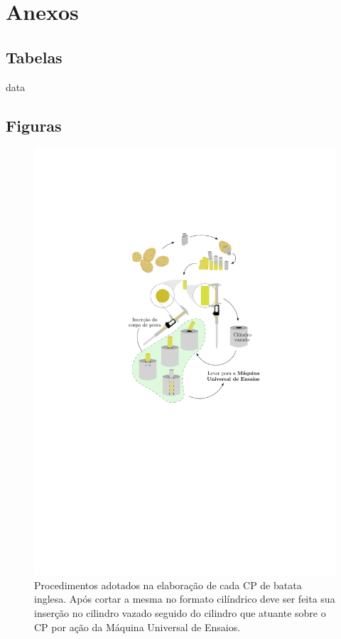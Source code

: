 \documentclass[a4paper, 12pt, brazilian]{article}
\begin{document}
	\section{Anexos}
	
	\subsection{Tabelas}
	
	{data}
	
	\subsection{Figuras}
	
	\begin{figure}[H]
		\centering
		\includegraphics[scale=1.1]{images/diagram}
		\caption{Procedimentos adotados na elaboração de cada CP de batata inglesa. Após cortar a mesma no formato cilíndrico deve ser feita sua inserção no cilindro vazado seguido do cilindro que atuante sobre o CP por ação da Máquina Universal de Ensaios.}
		\label{fig:diagram}
	\end{figure}
\end{document}
